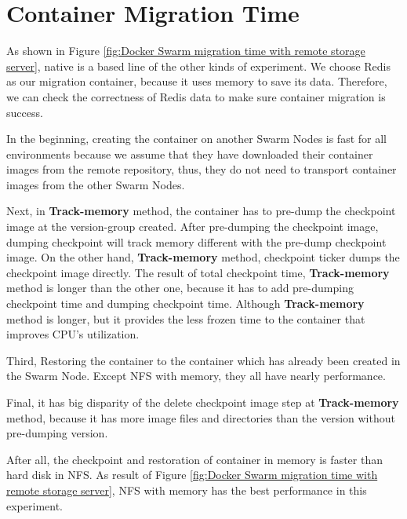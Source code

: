 \section{Container Migration Time}
As shown in Figure \ref{fig:Docker Swarm migration time with remote storage server}, native is a based line of the other kinds of experiment.
We choose Redis\cite{paksula2010persisting} as our migration container, because it uses memory to save its data. Therefore, we can check the correctness of Redis data to make sure container migration is success.

In the beginning, creating the container on another Swarm Nodes is fast for all environments because we assume that they have downloaded their container images from the remote repository, thus, they do not need to transport container images from the other Swarm Nodes.

Next, in \textbf{Track-memory} method, the container has to pre-dump the checkpoint image at the version-group created. After pre-dumping the checkpoint image, dumping checkpoint will track memory different with the pre-dump checkpoint image.
On the other hand, \textbf{Track-memory} method, checkpoint ticker dumps the checkpoint image directly.
The result of total checkpoint time, \textbf{Track-memory} method is longer than the other one, because it has to add pre-dumping checkpoint time and dumping checkpoint time.
Although \textbf{Track-memory} method is longer, but it provides the less frozen time to the container that improves CPU's utilization.

Third, Restoring the container to the container which has already been created in the Swarm Node. Except NFS with memory, they all have nearly performance.

Final, it has big disparity of the delete checkpoint image step at \textbf{Track-memory} method, because it has more image files and directories than the version without pre-dumping version.

After all, the checkpoint and restoration of container in memory is faster than hard disk in NFS.
As result of Figure \ref{fig:Docker Swarm migration time with remote storage server}, NFS with memory has the best performance in this experiment.

